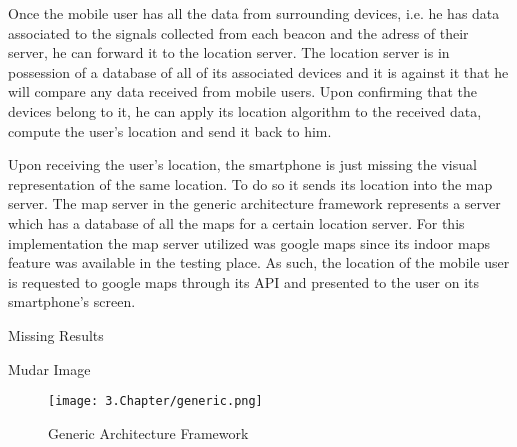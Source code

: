 Once the mobile user has all the data from surrounding devices, i.e. he has data associated to the signals collected from each beacon and the adress of their server, he can forward it to the location server. The location server is in possession of a database of all of its associated devices and it is against it that he will compare any data received from mobile users. Upon confirming that the devices belong to it, he can apply its location algorithm to the received data, compute the user's location and send it back to him. 

Upon receiving the user's location, the smartphone is just missing the visual representation of the same location. To do so it sends its location into the map server. The map server in the generic architecture framework represents a server which has a database of all the maps for a certain location server. For this implementation the map server utilized was google maps since its indoor maps feature was available in the testing place. As such, the location of the mobile user is requested to google maps through its API and presented to the user on its smartphone's screen.

Missing Results

Mudar Image

 \begin{figure}[H]
	\centering
		\texttt{[image: 3.Chapter/generic.png]}
	\caption[Generic Architecture Framework]{Generic Architecture Framework }
	\label{fig:solution}
\end{figure}